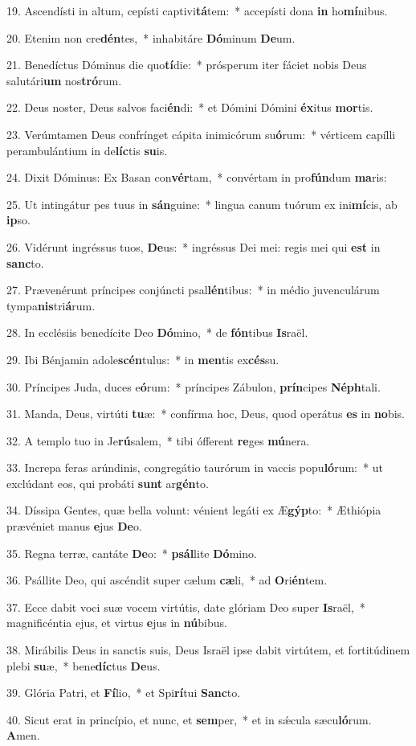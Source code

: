 19. Ascendísti in altum, cepísti captivi\textbf{tá}tem:~*  accepísti dona \textbf{in} ho\textbf{mí}nibus.\

20. Etenim non cre\textbf{dén}tes,~*  inhabitáre \textbf{Dó}minum \textbf{De}um.\

21. Benedíctus Dóminus die quo\textbf{tí}die:~*  prósperum iter fáciet nobis Deus salutári\textbf{um} nos\textbf{tró}rum.\

22. Deus noster, Deus salvos faci\textbf{én}di:~*  et Dómini Dómini \textbf{éx}itus \textbf{mor}tis.\

23. Verúmtamen Deus confrínget cápita inimicórum su\textbf{ó}rum:~*  vérticem capílli perambulántium in de\textbf{líc}tis \textbf{su}is.\

24. Dixit Dóminus: Ex Basan con\textbf{vér}tam,~*  convértam in pro\textbf{fún}dum \textbf{ma}ris:\

25. Ut intingátur pes tuus in \textbf{sán}guine:~*  lingua canum tuórum ex ini\textbf{mí}cis, ab \textbf{ip}so.\

26. Vidérunt ingréssus tuos, \textbf{De}us:~*  ingréssus Dei mei: regis mei qui \textbf{est} in \textbf{sanc}to.\

27. Prævenérunt príncipes conjúncti psal\textbf{lén}tibus:~*  in médio juvenculárum tympa\textbf{nis}tri\textbf{á}rum.\

28. In ecclésiis benedícite Deo \textbf{Dó}mino,~*  de \textbf{fón}tibus \textbf{Is}raël.\

29. Ibi Bénjamin adole\textbf{scén}tulus:~*  in \textbf{men}tis ex\textbf{cés}su.\

30. Príncipes Juda, duces e\textbf{ó}rum:~*  príncipes Zábulon, \textbf{prín}cipes \textbf{Néph}tali.\

31. Manda, Deus, virtúti \textbf{tu}æ:~*  confírma hoc, Deus, quod operátus \textbf{es} in \textbf{no}bis.\

32. A templo tuo in Je\textbf{rú}salem,~*  tibi ófferent \textbf{re}ges \textbf{mú}nera.\

33. Increpa feras arúndinis, congregátio taurórum in vaccis popu\textbf{ló}rum:~*  ut exclúdant eos, qui probáti \textbf{sunt} ar\textbf{gén}to.\

34. Díssipa Gentes, quæ bella volunt: vénient legáti ex Æ\textbf{gýp}to:~*  Æthiópia prævéniet manus \textbf{e}jus \textbf{De}o.\

35. Regna terræ, cantáte \textbf{De}o:~*  \textbf{psál}lite \textbf{Dó}mino.\

36. Psállite Deo, qui ascéndit super cælum \textbf{cæ}li,~*  ad \textbf{O}ri\textbf{én}tem.\

37. Ecce dabit voci suæ vocem virtútis, date glóriam Deo super \textbf{Is}raël,~*  magnificéntia ejus, et virtus \textbf{e}jus in \textbf{nú}bibus.\

38. Mirábilis Deus in sanctis suis, Deus Israël ipse dabit virtútem, et fortitúdinem plebi \textbf{su}æ,~*  bene\textbf{díc}tus \textbf{De}us.\

39. Glória Patri, et \textbf{Fí}lio,~*  et Spi\textbf{rí}tui \textbf{Sanc}to.\

40. Sicut erat in princípio, et nunc, et \textbf{sem}per,~*  et in sǽcula sæcu\textbf{ló}rum. \textbf{A}men.\

